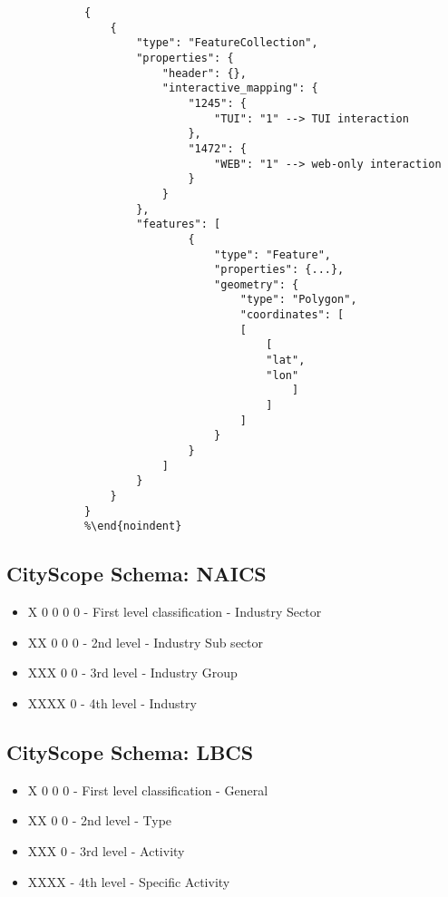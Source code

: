 {{\begin{Verbatim}[baselinestretch=0.75, tabsize=4, fontsize=\small]
            %\begin{noindent}
            {
                {
                    "type": "FeatureCollection",
                    "properties": {
                        "header": {},
                        "interactive_mapping": {
                            "1245": {
                                "TUI": "1" --> TUI interaction
                            },
                            "1472": {
                                "WEB": "1" --> web-only interaction
                            }
                        }
                    },
                    "features": [
                            {
                                "type": "Feature",
                                "properties": {...},
                                "geometry": {
                                    "type": "Polygon",
                                    "coordinates": [
                                    [
                                        [
                                        "lat",
                                        "lon"
                                            ]
                                        ]
                                    ]
                                }
                            }
                        ]
                    }
                }
            }
            %\end{noindent}
        \end{Verbatim}

    }




    \subsection{CityScope Schema: NAICS}\label{appendix:schema-description}
    {
        \begin{itemize}
            \item X 0 0 0 0 - First level classification - Industry Sector
            \item XX 0 0 0 - 2nd level - Industry Sub sector
            \item XXX 0 0 - 3rd level - Industry Group
            \item XXXX 0 - 4th level - Industry
        \end{itemize}
    }

    \subsection{CityScope Schema: LBCS}
    {
        \begin{itemize}
            \item X 0 0 0 - First level classification - General
            \item XX 0 0 - 2nd level - Type
            \item XXX 0 - 3rd level - Activity
            \item XXXX - 4th level - Specific Activity
        \end{itemize}
    }

}
